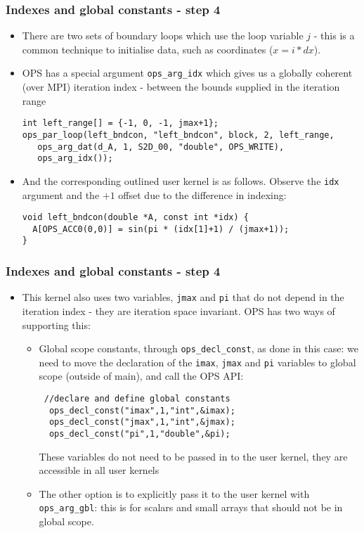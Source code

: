 \documentclass{beamer}
\begin{document}
\begin{frame}[fragile]
\frametitle{Indexes and global constants - step 4}
\begin{itemize}
\item There are two sets of boundary loops which use the loop variable $j$ - this is a common technique to initialise data, such as coordinates ($x=i*dx$).
\item OPS has a special argument \texttt{ops\_arg\_idx} which gives us a globally coherent (over MPI) iteration index - between the bounds supplied in the iteration range
\begin{lstlisting}
int left_range[] = {-1, 0, -1, jmax+1};
ops_par_loop(left_bndcon, "left_bndcon", block, 2, left_range,
   ops_arg_dat(d_A, 1, S2D_00, "double", OPS_WRITE),
   ops_arg_idx());
\end{lstlisting}  
  \item And the corresponding outlined user kernel is as follows. Observe the \texttt{idx} argument and the $+1$ offset due to the difference in indexing:
\begin{lstlisting}
void left_bndcon(double *A, const int *idx) {
  A[OPS_ACC0(0,0)] = sin(pi * (idx[1]+1) / (jmax+1));
}
\end{lstlisting}  
\end{itemize}
\end{frame}

\begin{frame}[fragile]
\frametitle{Indexes and global constants - step 4}
\begin{itemize}
\item This kernel also uses two variables, \texttt{jmax} and \texttt{pi} that do not depend in the iteration index - they are iteration space invariant. OPS has two ways of supporting this:
\begin{itemize}
\item Global scope constants, through \texttt{ops\_decl\_const}, as done in this case: we need to move the declaration of the \texttt{imax}, \texttt{jmax} and \texttt{pi} variables to global scope (outside of main), and call the OPS API:
\begin{lstlisting}
 //declare and define global constants
  ops_decl_const("imax",1,"int",&imax);
  ops_decl_const("jmax",1,"int",&jmax);
  ops_decl_const("pi",1,"double",&pi);
\end{lstlisting}  
These variables do not need to be passed in to the user kernel, they are accessible in all user kernels
\item The other option is to explicitly pass it to the user kernel with \texttt{ops\_arg\_gbl}: this is for scalars and small arrays that should not be in global scope.
\end{itemize}
\end{itemize}
\end{frame}
\end{document}
